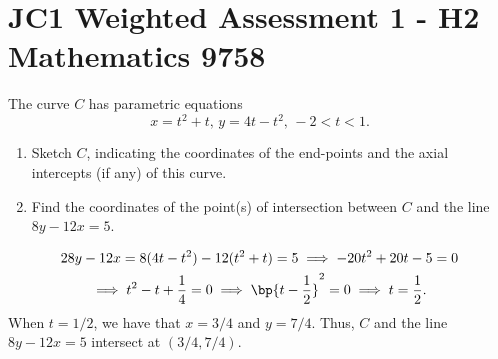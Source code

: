 \section{JC1 Weighted Assessment 1 - H2 Mathematics 9758}

\begin{problem}
    The curve $C$ has parametric equations \[x = t^2 + t, \, y = 4t - t^2, \, -2 < t < 1.\]

    \begin{enumerate}
        \item Sketch $C$, indicating the coordinates of the end-points and the axial intercepts (if any) of this curve.
        \item Find the coordinates of the point(s) of intersection between $C$ and the line $8y - 12x = 5$.
    \end{enumerate}
\end{problem}
\begin{solution}
    \begin{ppart}
        \begin{center}
        \end{center}
    \end{ppart}
    \begin{ppart}
        \begin{gather*}{2}
            8y-12x = 8(4t-t^2) - 12(t^2 + t) = 5 \implies -20t^2 + 20t - 5 = 0 \\
            \implies t^2 - t + \frac14 = 0 \implies \bp{t - \frac12}^2 = 0 \implies t = \frac12.
        \end{gather*}
        When $t = 1/2$, we have that $x = 3/4$ and $y = 7/4$. Thus, $C$ and the line $8y-12x=5$ intersect at $(3/4, 7/4)$.
    \end{ppart}
\end{solution}

